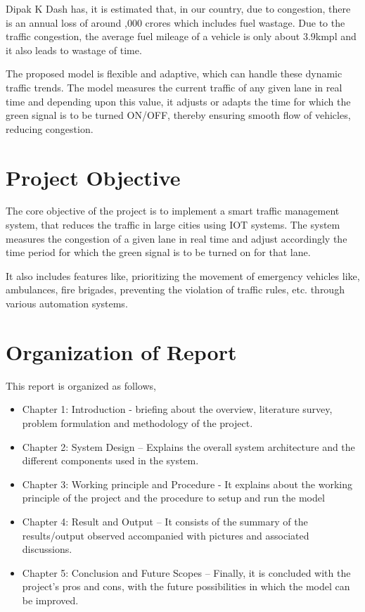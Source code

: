 Dipak K Dash \cite{trafficcongestion} has, it is estimated that, in our country, due to congestion, there is an annual loss of around ,000 crores which includes fuel wastage. Due to the traffic congestion, the average fuel mileage of a vehicle is only about 3.9kmpl and it also leads to wastage of time.

The proposed model is flexible and adaptive, which can handle these dynamic traffic trends. The model measures the current traffic of any given lane in real time and depending upon this value, it adjusts or adapts the time for which the green signal is to be turned ON/OFF, thereby ensuring smooth flow of vehicles, reducing congestion.

\section{Project Objective}
The core objective of the project is to implement a smart traffic management system, that reduces the traffic in large cities using IOT systems. The system measures the congestion of a given lane in real time and adjust accordingly the time period for which the green signal is to be turned on for that lane.

It also includes features like, prioritizing the movement of emergency vehicles like, ambulances, fire brigades, preventing the violation of traffic rules, etc. through various automation systems.

\pagebreak


\section{Organization of Report}
This report is organized as follows,
\begin{itemize}
\item Chapter 1: Introduction - briefing about the overview, literature survey, problem formulation and methodology of the project.
\item Chapter 2: System Design – Explains the overall system architecture and the different components used in the system.
\item Chapter 3: Working principle and Procedure - It explains about the working principle of the project and the procedure to setup and run the model
\item Chapter 4: Result and Output – It consists of the summary of the results/output observed accompanied with pictures and associated discussions.
\item Chapter 5: Conclusion and Future Scopes – Finally, it is concluded with the project’s pros and cons, with the future possibilities in which the model can be improved.
\end{itemize}
